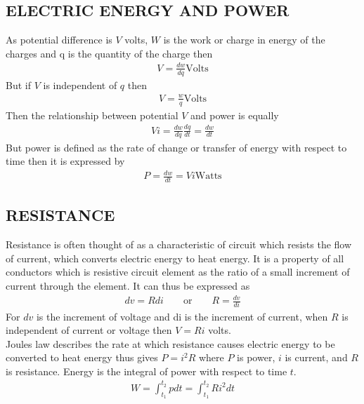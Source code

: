 \documentclass[11pt]{report}
\newcommand{\sps}{\\[0.2cm]}
\begin{document}
	\subsection{ELECTRIC ENERGY AND POWER}
	As potential difference is $V$ volts, $W$ is the work or charge in energy of the charges and q is the quantity of the charge then
	\begin{eqnarray}
		V=\frac{dw}{dq}\text{Volts}\label{eq:4_3}
	\end{eqnarray}
	But if $V$ is independent of $q$ then
	\begin{eqnarray}
		V = \frac{w}{q}\text{Volts}
	\end{eqnarray}
	Then the relationship between potential $V$ and power is equally
	\begin{eqnarray}
		Vi = \frac{dw}{dq}\frac{dq}{dt} = \frac{dw}{dt}\label{eq:4_5}
	\end{eqnarray}
	But power is defined as the rate of change or transfer of energy with respect to time then it is expressed by
	\begin{eqnarray}
		P =\frac{dw}{dt} = Vi\text{Watts}\label{eq:4_6}
	\end{eqnarray}
	
	\subsection{RESISTANCE}
	Resistance is often thought of as a characteristic of circuit which resists the flow of current, which converts electric energy to heat energy. It is a property of all conductors which is resistive circuit element as the ratio of a small increment of current through the element. It can thus be expressed as 
	\begin{eqnarray}
		dv = Rdi\qquad\text{or}\qquad R = \frac{dv}{di}\label{eq:4_7}
	\end{eqnarray}
	For $dv$ is the increment of voltage and di is the increment of current, when $R$ is independent of current or voltage then $V = Ri$ volts. \sps
	Joules law describes the rate at which resistance causes electric energy to be converted to heat energy thus gives $P = i^2 R$ where $P$ is power, $i$ is current, and $R$ is resistance. Energy is the integral of power with respect to time $t$.
	\begin{eqnarray*}
		W = \int_{t_1}^{t_2}pdt = \int_{t_1}^{t_2} Ri^2 dt
	\end{eqnarray*}
	
\end{document}
